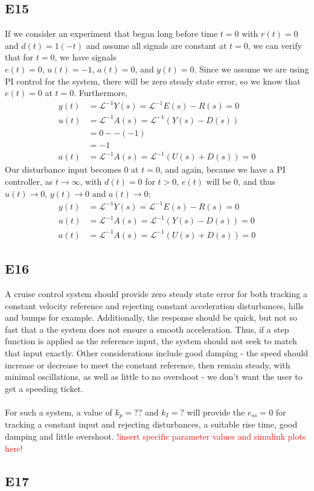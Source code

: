 \documentclass[10pt,titlepage]{article}
\begin{document}
	\subsection*{E15}
		If we consider an experiment that began long before time $t=0$ with $r(t)=0$ and $d(t)=1(-t)$ and assume all signals are constant at $t=0$, we can verify that for $t=0$, we have signals\\
		$e(t)=0$, $u(t)=-1$, $a(t)=0$, and $y(t)=0$.
	Since we assume we are using PI control for the system, there will be zero steady state error, so we know that $e(t)=0$ at $t=0$. Furthermore, 
	\begin{align*}
		y(t)&=\mathcal{L}^{-1}Y(s)=\mathcal{L}^{-1}E(s)-R(s)=0\\
		u(t)&=\mathcal{L}^{-1}A(s)=\mathcal{L}^{-1}(Y(s)-D(s))\\
		&=0--(-1)\\
		&=-1\\
		a(t)&=\mathcal{L}^{-1}A(s)=\mathcal{L}^{-1}(U(s)+D(s))=0
	\end{align*}
	Our disturbance input becomes 0 at $t=0$, and again, because we have a PI controller, as $t\to \infty$, with $d(t)=0$ for $t>0$, $e(t)$ will be 0, and thus $u(t)\to0$, $y(t)\to0$ and $a(t)\to0$:
	\begin{align*}
		y(t)&=\mathcal{L}^{-1}Y(s)=\mathcal{L}^{-1}E(s)-R(s)=0\\
		u(t)&=\mathcal{L}^{-1}A(s)=\mathcal{L}^{-1}(Y(s)-D(s))=0\\
		a(t)&=\mathcal{L}^{-1}A(s)=\mathcal{L}^{-1}(U(s)+D(s))=0
	\end{align*}
	
	\subsection*{E16}
		A cruise control system should provide zero steady state error for both tracking a constant velocity reference and rejecting constant acceleration disturbances, hills and bumps for example. Additionally, the response should be quick, but not so fast that a the system does not ensure a smooth acceleration. Thus, if a step function is applied as the reference input, the system should not seek to match that input exactly. Other considerations include good damping - the speed should increase or decrease to meet the constant reference, then remain steady, with minimal oscillations, as well as little to no overshoot - we don't want the user to get a speeding ticket.\\\\
		For such a system, a value of $k_p=??$ and $k_I=?$ will provide the $e_{ss}=0$ for tracking a constant input and rejecting disturbances, a suitable rise time, good damping and little overshoot. 
		\textcolor{red}{!insert specific parameter values and simulink plots here!}

	\subsection*{E17}
\end{document}
